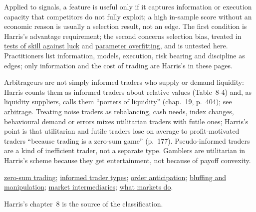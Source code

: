 \begin{qfdefinition}
Applied to signals, a feature is useful only if it captures information or execution capacity that competitors do not fully exploit; a high in-sample score without an economic reason is usually a selection result, not an edge. The first condition is Harris's advantage requirement; the second concerns selection bias, treated in \hyperref[meth:skill-luck-significance-tests]{tests of skill against luck} and \hyperref[pit:parameter-overfitting]{parameter overfitting}, and is untested here. Practitioners list information, models, execution, risk bearing and discipline as edges; only information and the cost of trading are Harris's in these pages.

 Arbitrageurs are not simply informed traders who supply or demand liquidity: Harris counts them as informed traders about relative values (Table~8-4) and, as liquidity suppliers, calls them ``porters of liquidity'' (chap.~19, p.~404); see \hyperref[def:arbitrage]{arbitrage}. Treating noise traders as rebalancing, cash needs, index changes, behavioural demand or errors mixes utilitarian traders with futile ones; Harris's point is that utilitarian and futile traders lose on average to profit-motivated traders ``because trading is a zero-sum game'' (p.~177). Pseudo-informed traders are a kind of inefficient trader, not a separate type. Gamblers are utilitarian in Harris's scheme because they get entertainment, not because of payoff convexity.

 \hyperref[res:zero-sum-skill-luck]{zero-sum trading}; \hyperref[def:informed-trader-types]{informed trader types}; \hyperref[def:order-anticipation]{order anticipation}; \hyperref[def:bluffing-manipulation]{bluffing and manipulation}; \hyperref[def:market-intermediaries]{market intermediaries}; \hyperref[def:market-functions]{what markets do}.

 Harris's chapter~8 is the source of the classification.

\end{qfdefinition}

